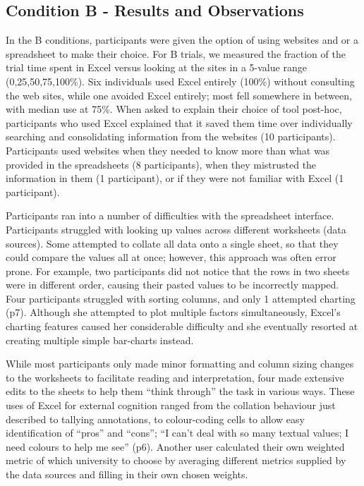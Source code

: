 \documentclass{sigchi}
\begin{document}
\subsection{Condition B - Results and Observations}
In the B conditions, participants were given the option of using websites and or a spreadsheet to make their choice.  For B trials, we measured the fraction of the trial time spent in Excel versus looking at the sites in a 5-value range (0,25,50,75,100\%).  Six individuals used Excel entirely (100\%) without consulting the web sites, while one avoided Excel entirely; most fell somewhere in between, with median use at 75\%.   When asked to explain their choice of tool post-hoc, participants who used Excel explained that it saved them time over individually searching and consolidating information from the websites (10 participants).  Participants used websites when they needed to know more than what was provided in the spreadsheets (8 participants), when they mistrusted the information in them (1 participant), or if they were not familiar with Excel (1 participant).

Participants ran into a number of difficulties with the spreadsheet interface. Participants struggled with looking up values across different worksheets (data sources).  Some attempted to collate all data onto a single sheet, so that they could compare the values all at once; however, this approach was often error prone.  For example, two participants did not notice that the rows in two sheets were in different order, causing their pasted values to be incorrectly mapped.  Four participants struggled with sorting columns, and only 1 attempted charting (p7).  Although she attempted to plot multiple factors simultaneously, Excel's charting features caused her considerable difficulty and she eventually resorted at creating multiple simple bar-charts instead.

While most participants only made minor formatting and column sizing changes to the worksheets to facilitate reading and interpretation,  four made extensive edits to the sheets to help them ``think through'' the task in various ways.  These uses of Excel for external cognition ranged from the collation behaviour just described to tallying annotations, to colour-coding cells to allow easy identification of  ``pros'' and ``cons''; ``I can't deal with so many textual values; I need colours to help me see'' (p6). Another user calculated their own weighted metric of which university to choose by averaging different metrics supplied by the data sources and filling in their own chosen weights.  
\end{document}
